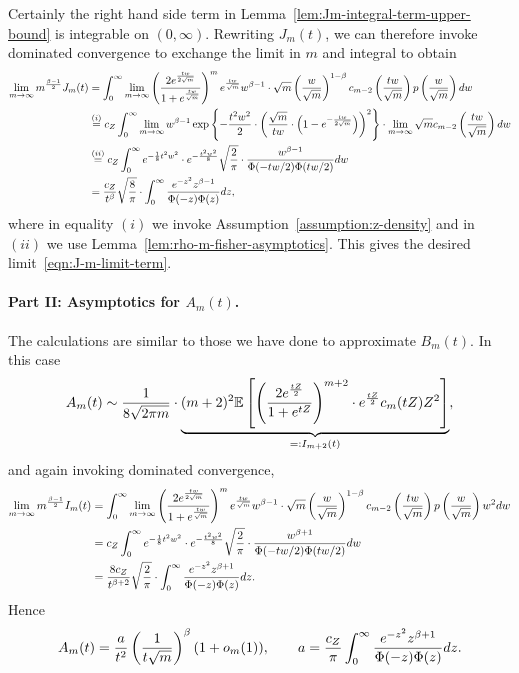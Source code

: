 Certainly the right hand side term in
Lemma~\ref{lem:Jm-integral-term-upper-bound} is integrable on $(0, \infty)$.
Rewriting $J_m(t)$, we can therefore invoke dominated convergence to
exchange the limit in $m$ and integral to obtain
\begin{align*}
	\lim_{m \to \infty} m^{\frac{\beta-1}{2}} J_m(t) & = \int_0^\infty \lim_{m \to \infty} \left({\frac{2e^{\frac{tw}{2\sqrt{m}}}}{1 + e^{\frac{tw}{\sqrt{m}}}}}\right)^{m} e^{\frac{tw}{\sqrt{m}}} w^{\beta-1}  \cdot \sqrt{m}  \left({\frac{w}{\sqrt{m}}}\right)^{1-\beta} c_{m-2}\left({\frac{tw}{\sqrt{m}}}\right) p \left({\frac{w}{\sqrt{m}}}\right) dw \nonumber \\
	& \stackrel{(i)}{=}  c_Z \int_0^\infty \lim_{m \to \infty} w^{\beta-1} \exp \left\{{-\frac{t^2w^2}{2} \cdot \left({\frac{\sqrt{m}}{tw} \cdot \left({1-e^{-\frac{tw}{2\sqrt{m}}}}\right)}\right)^2 }\right\} \cdot \lim_{m \to \infty} \sqrt{m} c_{m-2}\left({\frac{tw}{\sqrt{m}}}\right) dw \nonumber \\
	& \stackrel{(ii)}{=} c_Z \int_0^\infty e^{-\frac{1}{8}t^2w^2} \cdot  e^{-\frac{t^2 w^2}{8}} \sqrt{\frac{2}{\pi}} \cdot \frac{w^{\beta-1}}{\Phi(-tw/2) \Phi(tw/2)} dw \nonumber \\
	& = \frac{c_Z}{t^\beta} \sqrt{\frac{8}{\pi}} \cdot \int_0^\infty \frac{e^{-z^2} z^{\beta-1}}{\Phi(-z) \Phi(z)} dz,
\end{align*}
where in equality $(i)$ we invoke Assumption~\ref{assumption:z-density} and
in $(ii)$ we use Lemma~\ref{lem:rho-m-fisher-asymptotics}. This
gives the desired limit~\eqref{eqn:J-m-limit-term}.

\paragraph{Part II: Asymptotics for $A_m(t)$.}
The calculations are similar to those we have done to approximate
$B_m(t)$. In this case
\begin{align*}
	A_m(t) \sim \frac{1}{8\sqrt{2\pi m}} \cdot \underbrace{(m+2)^2 \mathbb{E} \left[{\left({\frac{2 e^{\frac{tZ}{2}}}{1 + e^{tZ}}}\right)^{m+2}\cdot e^{\frac{tZ}{2}} c_m(tZ) Z^2}\right]}_{=:I_{m+2}(t)},
\end{align*}
and again invoking dominated convergence,
\begin{align*}
  \lim_{m \to \infty}  m^{\frac{\beta-1}{2}} I_m(t) & = \int_0^\infty \lim_{m \to \infty} \left({\frac{2e^{\frac{tw}{2\sqrt{m}}}}{1 + e^{\frac{tw}{\sqrt{m}}}}}\right)^{m} e^{\frac{tw}{\sqrt{m}}} w^{\beta-1}  \cdot \sqrt{m}  \left({\frac{w}{\sqrt{m}}}\right)^{1-\beta} c_{m-2}\left({\frac{tw}{\sqrt{m}}}\right) p \left({\frac{w}{\sqrt{m}}}\right) w^2 dw \nonumber \\
  & = c_Z \int_0^\infty e^{-\frac{1}{8}t^2w^2} \cdot e^{-\frac{t^2 w^2}{8}} \sqrt{\frac{2}{\pi}} \cdot \frac{w^{\beta+1}}{\Phi(-tw/2) \Phi(tw/2)} dw \nonumber  \\
  &  = \frac{8 c_Z}{t^{\beta+2}} \sqrt{\frac{2}{\pi}} \cdot \int_0^\infty \frac{e^{-z^2} z^{\beta+1}}{\Phi(-z) \Phi(z)} dz.
\end{align*}
Hence
\begin{align*}
	A_m(t) = \frac{a}{t^2} \left({\frac{1}{t\sqrt{m}}}\right)^{\beta} (1 + o_m(1)), \qquad a = \frac{c_Z}{ \pi} \int_0^\infty \frac{e^{-z^2} z^{\beta+1}}{\Phi(-z) \Phi(z)} dz.
\end{align*}


